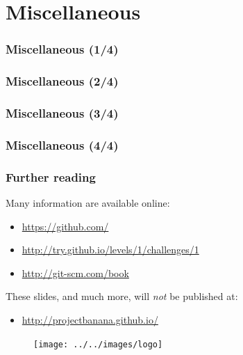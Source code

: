 \documentclass{beamer}
\begin{document}
\section{Miscellaneous}
\begin{frame}
\frametitle{Miscellaneous (1/4)}
\end{frame}
\begin{frame}
\frametitle{Miscellaneous (2/4)}
\end{frame}\begin{frame}
\frametitle{Miscellaneous (3/4)}
\end{frame}
\begin{frame}
\frametitle{Miscellaneous (4/4)}
\end{frame}

\begin{frame}
\frametitle{Further reading}
Many information are available online:
\begin{itemize}
 \item \url{https://github.com/}
 \item \url{http://try.github.io/levels/1/challenges/1}
 \item \url{http://git-scm.com/book}
\end{itemize}
These slides, and much more, will \textit{not} be published at:
\begin{itemize}
 \item \url{http://projectbanana.github.io/}
\end{itemize}
 \begin{figure}
\centering
 \texttt{[image: ../../images/logo]}
\end{figure}
\end{frame}
\end{document}

